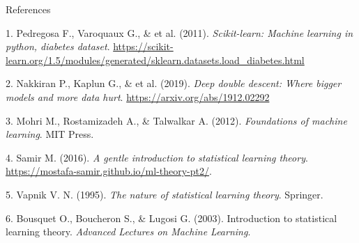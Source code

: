 \documentclass[
  ignorenonframetext,
]{beamer}
\newlength{\cslhangindent}
\newenvironment{CSLReferences}[2] %
 {\begin{list}{}{%
  \setlength{\itemindent}{0pt}
  \setlength{\leftmargin}{0pt}
  \setlength{\parsep}{0pt}
  \ifodd #1
   \setlength{\leftmargin}{\cslhangindent}
   \setlength{\itemindent}{-1\cslhangindent}
  \fi
  \setlength{\itemsep}{#2\baselineskip}}}
 {\end{list}}
\begin{document}
\begin{frame}
\begin{block}{References}
\label{references}
\label{refs}
\begin{CSLReferences}{1}{0}
\footnotesize

1. Pedregosa F., Varoquaux G., \& et al. (2011). \emph{Scikit-learn:
Machine learning in python, diabetes dataset}.
\url{https://scikit-learn.org/1.5/modules/generated/sklearn.datasets.load_diabetes.html}

2. Nakkiran P., Kaplun G., \& et al. (2019). \emph{Deep double descent:
Where bigger models and more data hurt}.
\url{https://arxiv.org/abs/1912.02292}

3. Mohri M., Rostamizadeh A., \& Talwalkar A. (2012). \emph{Foundations
of machine learning}. MIT Press.

4. Samir M. (2016). \emph{A gentle introduction to statistical learning
theory}. \url{https://mostafa-samir.github.io/ml-theory-pt2/}.

5. Vapnik V. N. (1995). \emph{The nature of statistical learning
theory}. Springer.

6. Bousquet O., Boucheron S., \& Lugosi G. (2003). Introduction to
statistical learning theory. \emph{Advanced Lectures on Machine
Learning}.

\end{CSLReferences}
\end{block}
\end{frame}
\end{document}
